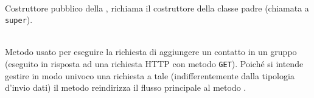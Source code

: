 \begin{description}
	\item{}\\
	Costruttore pubblico della , richiama il costruttore della classe padre (chiamata a \texttt{super}).
	
	\item{}\\
	Metodo usato per eseguire la richiesta di aggiungere un contatto in un gruppo (eseguito in risposta ad una richiesta HTTP con metodo \texttt{GET}). Poiché si intende gestire in modo univoco una richiesta a tale  (indifferentemente dalla tipologia d'invio dati) il metodo reindirizza il flusso principale al metodo .
	

\end{description}
